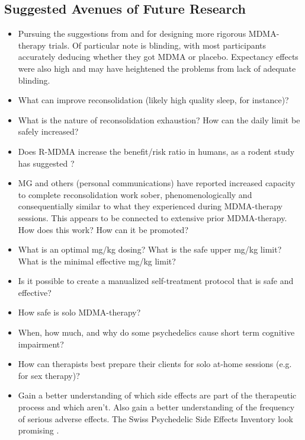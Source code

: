 \documentclass[12pt,letterpaper]{book}
\begin{document}
\subsection{Suggested Avenues of Future Research}
\begin{itemize}
    \item Pursuing the suggestions from \textcite{adayMethodologicalRigor} and \textcite{vanElkMethodology} for designing more rigorous MDMA-therapy trials. Of particular note is blinding, with most participants accurately deducing whether they got MDMA or placebo. Expectancy effects were also high and may have heightened the problems from lack of adequate blinding.
    \item What can improve reconsolidation (likely high quality sleep, for instance)?
    \item What is the nature of reconsolidation exhaustion? How can the daily limit be safely increased?
    \item Does R-MDMA increase the benefit/risk ratio in humans, as a rodent study has suggested \cite{curry2018RMDMA}?
    \item MG and others (personal communications) have reported increased capacity to complete reconsolidation work sober, phenomenologically and consequentially similar to what they experienced during MDMA-therapy sessions. This appears to be connected to extensive prior MDMA-therapy. How does this work? How can it be promoted?
    \item What is an optimal mg/kg dosing? What is the safe upper mg/kg limit? What is the minimal effective mg/kg limit?
    \item Is it possible to create a manualized self-treatment protocol that is safe and effective?
    \item How safe is solo MDMA-therapy?
    \item When, how much, and why do some psychedelics cause short term cognitive impairment?
    \item How can therapists best prepare their clients for solo at-home sessions (e.g. for sex therapy)?
    \item Gain a better understanding of which side effects are part of the therapeutic process and which aren't. Also gain a better understanding of the frequency of serious adverse effects. The Swiss Psychedelic Side Effects Inventory look promising \cite{caldervalidation}.
\end{itemize}
\printbibliography
{}
\end{document}
